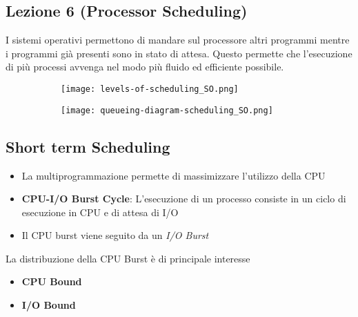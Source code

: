 \documentclass[12pt, a4paper]{article}
\begin{document}
	\subsection*{Lezione 6 (Processor Scheduling)}
	
	I sistemi operativi permettono di mandare sul processore altri programmi mentre i programmi già presenti sono in stato di attesa. Questo permette che l'esecuzione di più processi avvenga nel modo più fluido ed efficiente possibile. \\ 
	
	\begin{figure}[!htbp]
		\centering
		\begin{subfigure}{.3\textwidth}
			\centering
			\texttt{[image: levels-of-scheduling\_SO.png]}
			\caption*{}
			\label{fig:levels-of-scheduling}
		\end{subfigure}%
		\begin{subfigure}{.7\textwidth}
			\centering
			\texttt{[image: queueing-diagram-scheduling\_SO.png]}
			\caption*{}
			\label{fig:queueing-diagram-scheduling}
		\end{subfigure}%
		
	\end{figure}

	
	\subsection*{Short term Scheduling}
	
	\begin{itemize}
		\item La multiprogrammazione permette di massimizzare l'utilizzo della CPU
		\item \textbf{CPU-I/O Burst Cycle}: L'esecuzione di un processo consiste in un ciclo di esecuzione in CPU e di attesa di I/O
		\item Il CPU burst viene seguito da un \textit{I/O Burst} 
	\end{itemize}
	La distribuzione della CPU Burst è di principale interesse
	
	\begin{itemize}
		\item \textbf{CPU Bound}
		\item \textbf{I/O Bound}
	\end{itemize}
\end{document}
